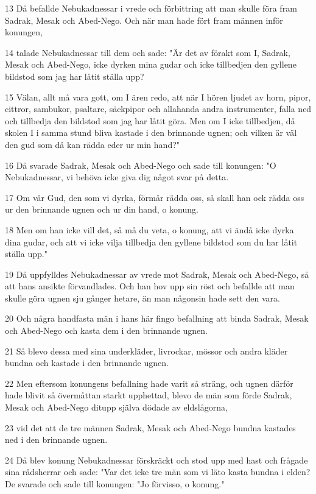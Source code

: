 \par 13 Då befallde Nebukadnessar i vrede och förbittring att man skulle föra fram Sadrak, Mesak och Abed-Nego. Och när man hade fört fram männen inför konungen,
\par 14 talade Nebukadnessar till dem och sade: "Är det av förakt som I, Sadrak, Mesak och Abed-Nego, icke dyrken mina gudar och icke tillbedjen den gyllene bildstod som jag har låtit ställa upp?
\par 15 Välan, allt må vara gott, om I ären redo, att när I hören ljudet av horn, pipor, cittror, sambukor, psaltare, säckpipor och allahanda andra instrumenter, falla ned och tillbedja den bildstod som jag har låtit göra. Men om I icke tillbedjen, då skolen I i samma stund bliva kastade i den brinnande ugnen; och vilken är väl den gud som då kan rädda eder ur min hand?"
\par 16 Då svarade Sadrak, Mesak och Abed-Nego och sade till konungen: "O Nebukadnessar, vi behöva icke giva dig något svar på detta.
\par 17 Om vår Gud, den som vi dyrka, förmår rädda oss, så skall han ock rädda oss ur den brinnande ugnen och ur din hand, o konung.
\par 18 Men om han icke vill det, så må du veta, o konung, att vi ändå icke dyrka dina gudar, och att vi icke vilja tillbedja den gyllene bildstod som du har låtit ställa upp."
\par 19 Då uppfylldes Nebukadnessar av vrede mot Sadrak, Mesak och Abed-Nego, så att hans ansikte förvandlades. Och han hov upp sin röst och befallde att man skulle göra ugnen sju gånger hetare, än man någonsin hade sett den vara.
\par 20 Och några handfasta män i hans här fingo befallning att binda Sadrak, Mesak och Abed-Nego och kasta dem i den brinnande ugnen.
\par 21 Så blevo dessa med sina underkläder, livrockar, mössor och andra kläder bundna och kastade i den brinnande ugnen.
\par 22 Men eftersom konungens befallning hade varit så sträng, och ugnen därför hade blivit så övermåttan starkt upphettad, blevo de män som förde Sadrak, Mesak och Abed-Nego ditupp själva dödade av eldslågorna,
\par 23 vid det att de tre männen Sadrak, Mesak och Abed-Nego bundna kastades ned i den brinnande ugnen.
\par 24 Då blev konung Nebukadnessar förskräckt och stod upp med hast och frågade sina rådsherrar och sade: "Var det icke tre män som vi läto kasta bundna i elden? De svarade och sade till konungen: "Jo förvisso, o konung."
